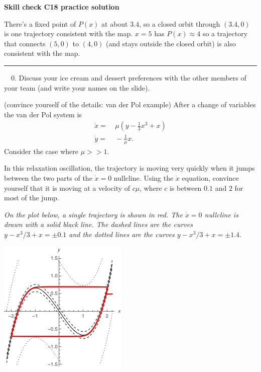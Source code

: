 \documentclass[12pt,letterpaper,noanswers]{exam}
\begin{document}
\noindent\textbf{Skill check C18 practice solution}


There's a fixed point of $P(x)$ at about $3.4$, so a closed orbit through $(3.4,0)$ is one trajectory consistent with the map.  $x = 5$ has $P(x) \approx 4$ so a trajectory that connects $(5,0)$ to $(4,0)$ (and stays outside the closed orbit) is also consistent with the map.



\vspace{0.2cm}

\hrule
\vspace{0.2cm}

\noindent \ \ 0.  Discuss your ice cream and dessert preferences with the other members of your team (and write your names on the slide).

\begin{questions}

\item (convince yourself of the details: van der Pol example) After a change of variables the van der Pol system is
\begin{align*}
\dot{x} = &\  \mu(y-\frac{1}{3}x^3 + x) \\
\dot{y} = &\ -\frac{1}{\mu} x.
\end{align*}
Consider the case where $\mu>>1$.
\begin{parts}
\item In this relaxation oscillation, the trajectory is moving very quickly when it jumps between the two parts of the $\dot{x}=0$ nullcline.
Using the $\dot{x}$ equation, convince yourself that it is moving at a velocity of $c\mu$, where $c$ is between $0.1$ and $2$ for most of the jump.  

\emph{On the plot below, a single trajectory is shown in red.  The $\dot x = 0$ nullcline is drawn with a solid black line.  The dashed lines are the curves $y - x^3/3 + x = \pm 0.1$ and the dotted lines are the curves $y - x^3/3 + x = \pm 1.4$.}


\includegraphics{img/191016-C17p3.png}


\end{parts}
\end{questions}
\end{document}
